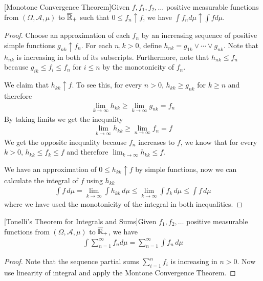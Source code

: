 \begin{thm}\label{MCT}[Monotone Convergence Theorem]Given $f, f_1,
  f_2, \dots$ positive measurable functions from
  $(\Omega, \mathcal{A}, \mu)$ to $\overline{\mathbb{R}}_+$ such that $0 \leq f_n \uparrow f$, we
  have $\int f_n d \mu \uparrow \int f d \mu$.
\end{thm}
\begin{proof}Choose an approximation of each $f_n$ by an increasing
  sequence of positive simple functions $g_{nk} \uparrow f_n$.  For
  each $n,k>0$, define $h_{nk} = g_{1k} \vee \cdots \vee g_{nk}$.
  Note that $h_{nk}$ is increasing in both of its subscripts.
  Furthermore, note that $h_{nk} \leq f_n$ because $g_{ik} \leq f_{i}
  \leq f_n$ for $i \leq n$ by the monotonicity of $f_n$.

We  claim that $h_{kk} \uparrow f$.  To see this, for every $n>0$,
  $h_{kk} \geq g_{nk}$ for $k \geq n$ and therefore
\begin{align*}
\lim_{k \to \infty} h_{kk} \geq \lim_{k \to \infty} g_{nk} = f_n
\end{align*}
By taking limits we get the inequality
\begin{align*}
\lim_{k \to \infty} h_{kk} \geq \lim_{n \to \infty} f_n = f
\end{align*}
We get the opposite inequality because $f_n$ increases to $f$, we know that for
every $k>0$, $h_{kk} \leq f_k \leq f$ and therefore $\lim_{k \to
  \infty} h_{kk} \leq f$.

We have an approximation of $0 \leq h_{kk} \uparrow f$ by simple
functions, now we can calculate the integral of $f$ using $h_{kk}$
\begin{align*}
\int f \, d\mu = \lim_{k \to \infty} \int h_{kk} \, d\mu \leq \lim_{k
  \to \infty} \int f_k \, d\mu \leq \int f \, d\mu
\end{align*}
where we have used the monotonicity of the integral in both
inequalities.  
\end{proof}
\begin{cor}\label{TonelliIntegralSum}[Tonelli's Theorem for Integrals
  and Sums]Given $f_1,
  f_2, \dots$ positive measurable functions from
  $(\Omega, \mathcal{A}, \mu)$ to $\overline{\mathbb{R}}_+$, we
  have 
\begin{align*}
\int \sum_{n=1}^\infty f_n d \mu = \sum_{n=1}^\infty \int f_n \, d \mu
\end{align*}
\end{cor}
\begin{proof}Note that the sequence partial sums $\sum_{i=1}^n f_i$ is
  increasing in $n>0$.  Now use linearity of integral and apply the Montone Convergence Theorem.
\end{proof}

